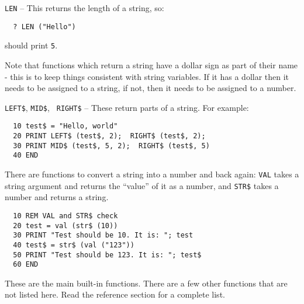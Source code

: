 {\tt LEN} -- This returns the length of a string, so:
\begin{verbatim}
  ? LEN ("Hello")
\end{verbatim}
should print {\tt 5}.

Note \meek that functions which return a string have a dollar sign
as part of their name - this is to keep things consistent with string
variables. If it has a dollar then it needs to be assigned to a string,
if not, then it needs to be assigned to a number.

{\tt LEFT\$}, {\tt MID\$}, {\tt
RIGHT\$} -- These return parts of a string. For example:
\begin{verbatim}
  10 test$ = "Hello, world"
  20 PRINT LEFT$ (test$, 2);  RIGHT$ (test$, 2);
  30 PRINT MID$ (test$, 5, 2);  RIGHT$ (test$, 5)
  40 END
\end{verbatim}
There are functions to convert a string into a number and back again:
{\tt VAL} takes a string argument and returns the ``value'' of it as
a number, and {\tt STR\$} takes a number and returns a string.
\begin{verbatim}
  10 REM VAL and STR$ check
  20 test = val (str$ (10))
  30 PRINT "Test should be 10. It is: "; test
  40 test$ = str$ (val ("123"))
  50 PRINT "Test should be 123. It is: "; test$
  60 END
\end{verbatim}
These are the main built-in functions. There are a few other functions
that are not listed here. Read the reference section for a complete list.
